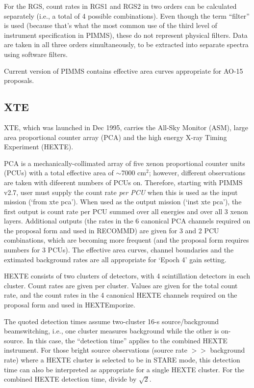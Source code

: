 For the RGS, count rates in RGS1 and RGS2 in two orders can be calculated
separately (i.e., a total of 4 possible combinations).
Even though the term ``filter'' is used (because that's what the most
common use of the third level of instrument specification in PIMMS),
these do not represent physical filters.  Data are taken in all three
orders simultaneously, to be extracted into separate spectra using
software filters.

Current version of PIMMS contains effective area curves appropriate for
AO-15 proposals.

\subsection{XTE}

XTE, which was launched in Dec 1995,
carries the All-Sky Monitor (ASM), large area proportional counter array
(PCA) and the high energy X-ray Timing Experiment (HEXTE).

PCA is a mechanically-collimated array of five xenon proportional counter
units (PCUs) with a total effective area of $\sim$7000 cm$^2$; however,
different observations are taken with difeerent numbers of PCUs on.  Therefore,
starting with PIMMS v2.7, user must supply the count rate {\sl per PCU\/}
when this is used as the input mission (`from xte pca').  When used as the
output mission (`inst xte pca'), the first output is count rate per PCU summed
over all energies and over all 3 xenon layers.  Additional outputs (the rates
in the 6 canonical PCA channels required on the proposal form and used in
RECOMMD) are given for 3 and 2 PCU combinations, which are becoming more
frequent (and the proposal form requires numbers for 3 PCUs).  The effective
area curves, channel boundaries and the extimated background rates are all
appropriate for `Epoch 4' gain setting.

HEXTE consists of two clusters of
detectors, with 4 scintillation detectors in each cluster.  Count rates are 
given per cluster.  Values are given for the total count rate, and the count 
rates in the 4 canonical HEXTE channels required on the proposal form and 
used in HEXTEmporize.

The quoted detection times assume two-cluster 16-s source/background
beamswitching, i.e., one cluster measures background while the other is
on-source.  In this case, the ``detection time'' applies to the combined
HEXTE instrument.  For those bright source observations (source rate $>>$
background rate) where a HEXTE cluster is selected to be in STARE mode,
this detection time can also be interpreted as appropriate for a single
HEXTE cluster.  For the combined HEXTE detection time, divide by $\sqrt{2}$.

